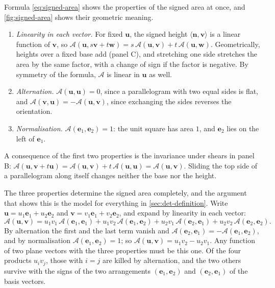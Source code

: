 Formula \eqref{eq:signed-area} shows the properties of the signed area at once, and \cref{fig:signed-area} shows their geometric meaning.
\begin{enumerate}
\item \emph{Linearity in each vector.} For fixed $\mathbf u$, the signed height $\langle\mathbf n,\mathbf v\rangle$ is a linear function of $\mathbf v$, so $\mathcal A(\mathbf u,s\mathbf v+t\mathbf w)=s\,\mathcal A(\mathbf u,\mathbf v)+t\,\mathcal A(\mathbf u,\mathbf w)$. Geometrically, heights over a fixed base add (panel C), and stretching one side stretches the area by the same factor, with a change of sign if the factor is negative. By symmetry of the formula, $\mathcal A$ is linear in $\mathbf u$ as well.
\item \emph{Alternation.} $\mathcal A(\mathbf u,\mathbf u)=0$, since a parallelogram with two equal sides is flat, and $\mathcal A(\mathbf v,\mathbf u)=-\mathcal A(\mathbf u,\mathbf v)$, since exchanging the sides reverses the orientation.
\item \emph{Normalisation.} $\mathcal A(\mathbf e_1,\mathbf e_2)=1$: the unit square has area $1$, and $\mathbf e_2$ lies on the left of $\mathbf e_1$.
\end{enumerate}
A consequence of the first two properties is the invariance under shears in panel B: $\mathcal A(\mathbf u,\mathbf v+t\mathbf u)=\mathcal A(\mathbf u,\mathbf v)+t\,\mathcal A(\mathbf u,\mathbf u)=\mathcal A(\mathbf u,\mathbf v)$. Sliding the top side of a parallelogram along itself changes neither the base nor the height.

The three properties determine the signed area completely, and the argument that shows this is the model for everything in \cref{sec:det-definition}. Write $\mathbf u=u_1\mathbf e_1+u_2\mathbf e_2$ and $\mathbf v=v_1\mathbf e_1+v_2\mathbf e_2$, and expand by linearity in each vector:
\[
\mathcal A(\mathbf u,\mathbf v)=u_1v_1\,\mathcal A(\mathbf e_1,\mathbf e_1)+u_1v_2\,\mathcal A(\mathbf e_1,\mathbf e_2)+u_2v_1\,\mathcal A(\mathbf e_2,\mathbf e_1)+u_2v_2\,\mathcal A(\mathbf e_2,\mathbf e_2).
\]
By alternation the first and the last term vanish and $\mathcal A(\mathbf e_2,\mathbf e_1)=-\mathcal A(\mathbf e_1,\mathbf e_2)$, and by normalisation $\mathcal A(\mathbf e_1,\mathbf e_2)=1$; so $\mathcal A(\mathbf u,\mathbf v)=u_1v_2-u_2v_1$. Any function of two plane vectors with the three properties must be this one. Of the four products $u_iv_j$, those with $i=j$ are killed by alternation, and the two others survive with the signs of the two arrangements $(\mathbf e_1,\mathbf e_2)$ and $(\mathbf e_2,\mathbf e_1)$ of the basis vectors.

